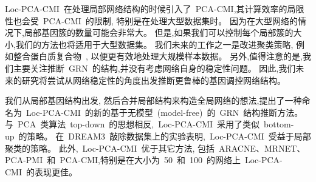 Loc-PCA-CMI~在处理局部网络结构的时候引入了~PCA-CMI,其计算效率的局限性也会受~PCA-CMI~的限制,
特别是在处理大型数据集时。
因为在大型网络的情况下,局部基因簇的数量可能会非常大。
但是,如果我们可以控制每个局部簇的大小,我们的方法也将适用于大型数据集。
我们未来的工作之一是改进聚类策略,
例如整合蛋白质复合物~\cite{li2017identification, li2017dynetviewer},
以便更有效地处理大规模样本数据。
另外,值得注意的是,我们主要关注推断~GRN~的结构,并没有考虑网络自身的稳定性问题。
因此,我们未来的研究将尝试从网络稳定性的角度出发推断更鲁棒的基因调控网络结构。

我们从局部基因结构出发, 然后合并局部结构来构造全局网络的想法,提出了一种命名为~Loc-PCA-CMI~的新的基于无模型~(model-free)~的~GRN~结构推断方法。
与~PCA~类算法~top-down~的思想相反,~Loc-PCA-CMI~采用了类似~bottom-up~的策略。
在~DREAM3~敲除数据集上的实验表明,~Loc-PCA-CMI~受益于局部聚类的策略。
此外,~Loc-PCA-CMI~优于其它方法,
包括~ARACNE、MRNET、PCA-PMI~和~PCA-CMI,特别是在大小为~50~和~100~的网络上~Loc-PCA-CMI~的表现更佳。